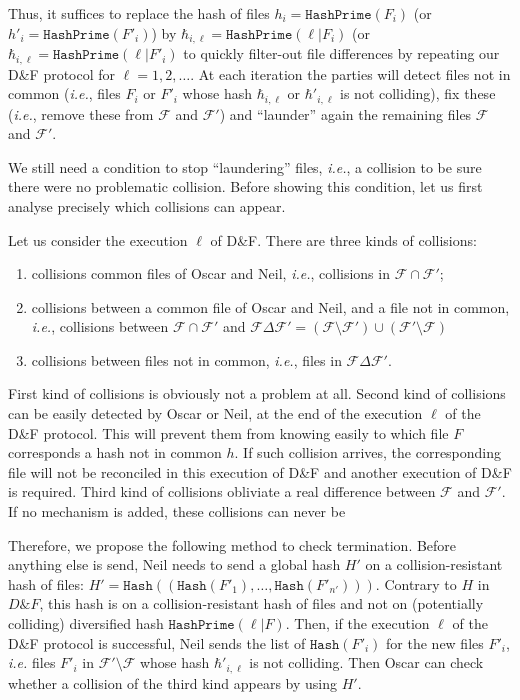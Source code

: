 \documentclass[11pt]{llncs}
\newcommand{\Files}{\mathcal{F}}
\newcommand{\df}{D\&F\xspace}
\newcommand{\ie}{\textit{i.e.}\xspace}
\newcommand{\Hash}{\ensuremath{\mathtt{Hash}}}
\newcommand{\HashPrime}{\ensuremath{\mathtt{HashPrime}}}
\begin{document}
Thus, it suffices to replace the hash of files $h_i = \HashPrime(F_i)$ (or $h'_i = \HashPrime(F'_i)$) by $\hbar_{i,\ell}=\HashPrime(\ell|F_i)$ (or $\hbar_{i,\ell} = \HashPrime(\ell|F'_i)$ to quickly filter-out file differences by repeating our \df protocol for $\ell=1,2,\ldots$. 
At each iteration the parties will detect files not in common (\ie, files $F_i$ or $F'_i$ whose hash $\hbar_{i,\ell}$ or $\hbar'_{i,\ell}$ is not colliding), fix these (\ie, remove these from $\Files$ and $\Files'$) and ``launder'' again the remaining files $\Files$ and $\Files'$.

We still need a condition to stop ``laundering'' files, \ie, a collision to be sure there were no problematic collision.
Before showing this condition, let us first analyse precisely which collisions can appear.

Let us consider the execution $\ell$ of \df.
There are three kinds of collisions:
\begin{enumerate}
\item collisions common files of Oscar and Neil, \ie, collisions in $\Files \cap \Files'$;
\item collisions between a common file of Oscar and Neil, and a file not in common, \ie, collisions between $\Files \cap \Files'$ and $\Files \Delta \Files' = (\Files \setminus \Files') \cup (\Files' \setminus \Files)$
\item collisions between files not in common, \ie, files in $\Files \Delta \Files'$.
\end{enumerate}
First kind of collisions is obviously not a problem at all.
Second kind of collisions can be easily detected by Oscar or Neil, at the end of the execution $\ell$ of the \df protocol. 
This will prevent them from knowing easily to which file $F$ corresponds a hash not in common $h$.
If such collision arrives, the corresponding file will not be reconciled in this execution of \df and another execution of \df is required.
Third kind of collisions obliviate a real difference between $\Files$ and $\Files'$. If no mechanism is added, these collisions can never be

Therefore, we propose the following method to check termination.
Before anything else is send, Neil needs to send a global hash $H'$ on a collision-resistant hash of files: $H' = \Hash((\Hash(F'_1),\dots,\Hash(F'_{n'})))$.
Contrary to $H$ in $\df$, this hash is on a collision-resistant hash of files and not on (potentially colliding) diversified hash $ \HashPrime(\ell|F)$.
Then, if the execution $\ell$ of the \df protocol is successful, Neil sends the list of $\Hash(F'_i)$ for the new files $F'_i$, \ie files $F'_i$ in $\Files' \setminus \Files$ whose hash $\hbar'_{i,\ell}$ is not colliding.
Then Oscar can check whether a collision of the third kind appears by using $H'$.
\end{document}
